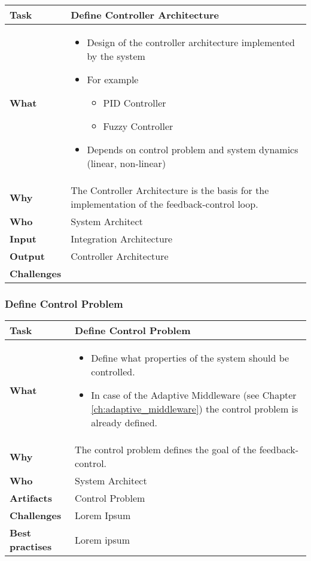 \begin{tabularx}{\textwidth}{@{} l X @{}}
	\caption{Define Controller Architecture} \label{table:ch6_Task_Define_Controller_Architecture}\\
	\toprule 
	\bfseries Task & Define Controller Architecture\\
	\midrule 
	\bfseries What & 
	\begin{itemize}
		\item Design of the controller architecture implemented by the system
		\item For example
		\begin{itemize}
			\item PID Controller
			\item Fuzzy Controller
		\end{itemize}
		\item Depends on control problem and system dynamics (linear, non-linear)
	\end{itemize}
	\\
	\midrule 
	\bfseries Why & The Controller Architecture is the basis for the implementation of the feedback-control loop.\\
	\midrule 
	\bfseries Who & System Architect\\
	\midrule 
	\bfseries Input & Integration Architecture\\
	\midrule 
	\bfseries Output & Controller Architecture\\
	\midrule 
	\bfseries Challenges & \\
	\bottomrule 
\end{tabularx}


\subsubsection{Define Control Problem}

\begin{tabularx}{\textwidth}{@{} l X @{}}
	\caption{Define Control Problem} \label{table:ch6_Task_Define_Control_Problem}\\
	\toprule 
	\bfseries Task & Define Control Problem\\
	\midrule 
	\bfseries What & 
	\begin{itemize}
		\item Define what properties of the system should be controlled.
		\item In case of the Adaptive Middleware (see Chapter \ref{ch:adaptive_middleware}) the control problem is already defined.
	\end{itemize}
	\\
	\midrule 
	\bfseries Why & The control problem defines the goal of the feedback-control.\\
	\midrule 
	\bfseries Who & System Architect\\
	\midrule 
	\bfseries Artifacts & Control Problem\\
	\midrule 
	\bfseries Challenges & Lorem Ipsum\\
	\midrule 
	\bfseries Best practises & Lorem ipsum\\
	\bottomrule 
\end{tabularx}


